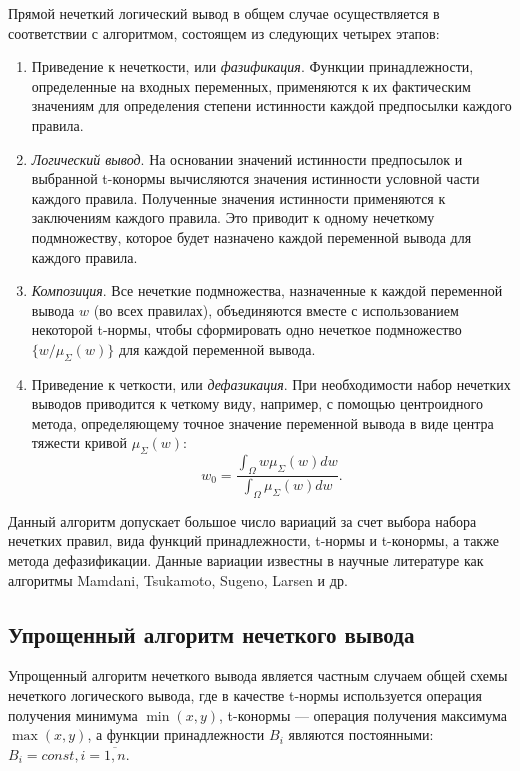 Прямой нечеткий логический вывод в общем случае осуществляется в
соответствии с алгоритмом, состоящем из следующих четырех этапов:
\begin{enumerate}
\item Приведение к нечеткости, или \emph{фазификация}.
  Функции принадлежности, определенные на входных переменных,
  применяются к их фактическим значениям для определения степени
  истинности каждой предпосылки каждого правила.
\item \emph{Логический вывод}.
  На основании значений истинности предпосылок и выбранной t-конормы вычисляются
  значения истинности условной части каждого правила.
  Полученные значения истинности применяются к заключениям каждого правила.
  Это приводит к одному нечеткому подмножеству, которое будет назначено
  каждой переменной вывода для каждого правила.
\item \emph{Композиция}.
  Все нечеткие подмножества, назначенные к каждой переменной вывода \( w \)
  (во всех правилах), объединяются вместе с использованием некоторой t-нормы,
  чтобы сформировать одно нечеткое подмножество \( \{ w / \mu_{\Sigma}(w) \}\)
  для каждой переменной вывода.
\item Приведение к четкости, или \emph{дефазикация}.
  При необходимости набор нечетких выводов приводится к четкому виду,
  например, с помощью центроидного метода, определяющему точное значение переменной вывода
  в виде центра тяжести кривой \( \mu_{\Sigma}(w) \):
  \[
    w_0 = \dfrac{\int_{\Omega} w \mu_{\Sigma}(w) dw}{\int_{\Omega} \mu_{\Sigma}(w) dw}.
  \]
\end{enumerate}

Данный алгоритм допускает большое число вариаций за счет выбора
набора нечетких правил, вида функций принадлежности, t-нормы и t-конормы,
а также метода дефазификации.
Данные вариации известны в научные литературе как
алгоритмы Mamdani, Tsukamoto, Sugeno, Larsen и др.

\pagebreak

\subsection{Упрощенный алгоритм нечеткого вывода}

Упрощенный алгоритм нечеткого вывода является частным случаем
общей схемы нечеткого логического вывода,
где в качестве t-нормы используется операция получения минимума \( \min(x, y) \),
t-конормы --- операция получения максимума \( \max(x, y) \),
а функции принадлежности \( B_i \) являются постоянными:
\( B_i = const, i = \overline{1, n} \).

